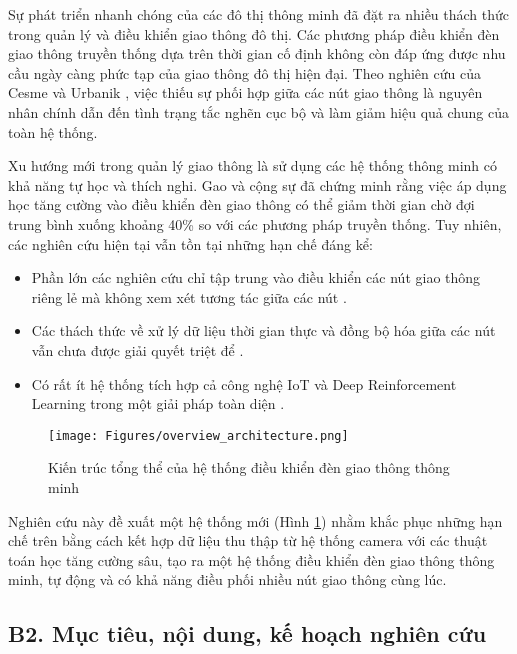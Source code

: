 \documentclass[letterpaper]{article}
\begin{document}
Sự phát triển nhanh chóng của các đô thị thông minh đã đặt ra nhiều thách thức trong quản lý và điều khiển giao thông đô thị. Các phương pháp điều khiển đèn giao thông truyền thống dựa trên thời gian cố định không còn đáp ứng được nhu cầu ngày càng phức tạp của giao thông đô thị hiện đại. Theo nghiên cứu của Cesme và Urbanik \cite{cesme2021signal}, việc thiếu sự phối hợp giữa các nút giao thông là nguyên nhân chính dẫn đến tình trạng tắc nghẽn cục bộ và làm giảm hiệu quả chung của toàn hệ thống.

Xu hướng mới trong quản lý giao thông là sử dụng các hệ thống thông minh có khả năng tự học và thích nghi. Gao và cộng sự \cite{gao2017adaptive} đã chứng minh rằng việc áp dụng học tăng cường vào điều khiển đèn giao thông có thể giảm thời gian chờ đợi trung bình xuống khoảng 40\% so với các phương pháp truyền thống. Tuy nhiên, các nghiên cứu hiện tại vẫn tồn tại những hạn chế đáng kể:

\begin{itemize}
    \item Phần lớn các nghiên cứu chỉ tập trung vào điều khiển các nút giao thông riêng lẻ mà không xem xét tương tác giữa các nút \cite{yasa2024reducing}.
    \item Các thách thức về xử lý dữ liệu thời gian thực và đồng bộ hóa giữa các nút vẫn chưa được giải quyết triệt để \cite{el2014design}.
    \item Có rất ít hệ thống tích hợp cả công nghệ IoT và Deep Reinforcement Learning trong một giải pháp toàn diện \cite{aradi2020survey}.
\end{itemize}

\begin{figure}[!hbt]
    \centering
    \texttt{[image: Figures/overview\_architecture.png]}
    \caption{Kiến trúc tổng thể của hệ thống điều khiển đèn giao thông thông minh}
    \label{fig:sys-arch}
\end{figure}

Nghiên cứu này đề xuất một hệ thống mới (Hình \ref{fig:sys-arch}) nhằm khắc phục những hạn chế trên bằng cách kết hợp dữ liệu thu thập từ hệ thống camera với các thuật toán học tăng cường sâu, tạo ra một hệ thống điều khiển đèn giao thông thông minh, tự động và có khả năng điều phối nhiều nút giao thông cùng lúc.

\subsection{B2. Mục tiêu, nội dung, kế hoạch nghiên cứu}
\end{document}
